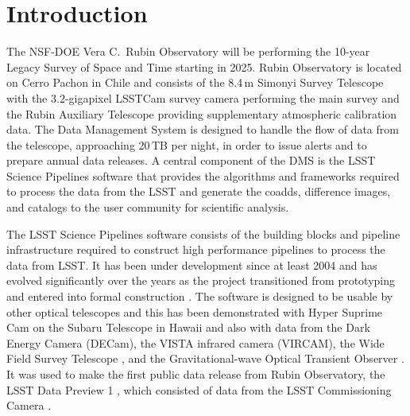 \section{Introduction}
\label{sec:intro}

The NSF-DOE Vera C.\ Rubin Observatory will be performing the 10-year Legacy Survey of Space and Time \citep[LSST;][]{2019ApJ...873..111I} starting in 2025.
Rubin Observatory is located on Cerro Pachon in Chile and consists of the 8.4\,m Simonyi Survey Telescope \citep{2022SPIE12182E..0WT} with the 3.2-gigapixel LSSTCam survey camera \citep{2024SPIE13096E..1SR} performing the main survey and the Rubin Auxiliary Telescope \citep{2020SPIE11452E..0UI} providing supplementary atmospheric calibration data.
The Data Management System \citep[DMS;][]{2022arXiv221113611O} is designed to handle the flow of data from the telescope, approaching 20\,TB per night, in order to issue alerts and to prepare annual data releases.
A central component of the DMS is the LSST Science Pipelines software that provides the algorithms and frameworks required to process the data from the LSST and generate the coadds, difference images, and catalogs to the user community for scientific analysis.

The LSST Science Pipelines software consists of the building blocks and pipeline infrastructure required to construct high performance pipelines to process the data from LSST.
It has been under development since at least 2004 \citep{2004AAS...20510811A} and has evolved significantly over the years as the project transitioned from prototyping \citep{2010SPIE.7740E..15A} and entered into formal construction \citep{2017ASPC..512..279J}.
The software is designed to be usable by other optical telescopes and this has been demonstrated with Hyper Suprime Cam on the Subaru Telescope in Hawaii \citep{2018PASJ...70S...5B} and also with data from the Dark Energy Camera (DECam),  the VISTA infrared camera (VIRCAM), the Wide Field Survey Telescope \citep[WFST;][]{2025arXiv250115018C}, and the Gravitational-wave Optical Transient Observer \citep[GOTO;][]{2021PASA...38....4M}.
It was used to make the first public data release from Rubin Observatory, the LSST Data Preview 1 \citep{RTN-095,10.71929/rubin/2570308}, which consisted of data from the LSST Commissioning Camera \citep[LSSTComCam;][]{10.71929/rubin/2561361,2022SPIE12184E..0JS}.

